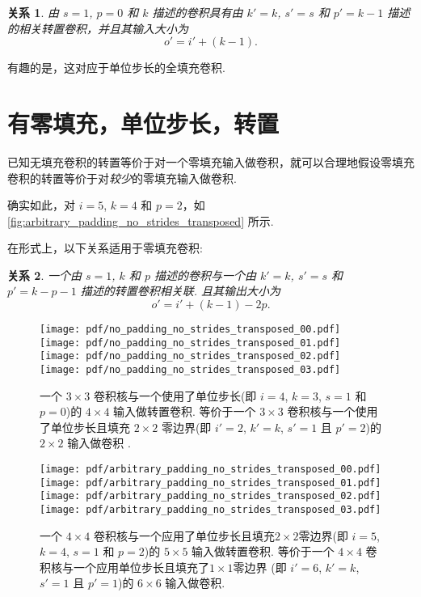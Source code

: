 \documentclass[notitlepage]{ctexrep}
\newtheorem{relationship}{关系}
\begin{document}
\begin{relationship}\label{rel:no_padding_no_strides_transposed}
由 $s = 1$, $p = 0$ 和 $k$ 描述的卷积具有由 $k' = k$, $s' = s$ 和 $p' = k - 1$ 描述的相关转置卷积，并且其输入大小为 
\begin{equation*}
    o' = i' + (k - 1).
\end{equation*}
\end{relationship}

有趣的是，这对应于单位步长的全填充卷积.

\section{有零填充，单位步长，转置}

已知无填充卷积的转置等价于对一个零填充输入做卷积，就可以合理地假设零填充卷积的转置等价于对{\em 较少}的零填充输入做卷积.

确实如此，对 $i = 5$, $k = 4$ 和 $p = 2$，如 \autoref{fig:arbitrary_padding_no_strides_transposed} 所示.

在形式上，以下关系适用于零填充卷积:

\begin{relationship}\label{rel:arbitrary_padding_no_strides_transposed}
一个由 $s = 1$, $k$ 和 $p$ 描述的卷积与一个由 $k' = k$, $s' = s$ 和 $p' = k -
p - 1$ 描述的转置卷积相关联. 且其输出大小为
\begin{equation*}
    o' = i' + (k - 1) - 2p.
\end{equation*}
\end{relationship}

\begin{figure}[p]
    \centering
    \texttt{[image: pdf/no\_padding\_no\_strides\_transposed\_00.pdf]}
    \texttt{[image: pdf/no\_padding\_no\_strides\_transposed\_01.pdf]}
    \texttt{[image: pdf/no\_padding\_no\_strides\_transposed\_02.pdf]}
    \texttt{[image: pdf/no\_padding\_no\_strides\_transposed\_03.pdf]}
    \caption{\label{fig:no_padding_no_strides_transposed} 
    一个 $3 \times 3$ 卷积核与一个使用了单位步长(即 $i = 4$, $k = 3$, $s = 1$ 和 $p = 0$)的 $4 \times 4$ 输入做转置卷积. 等价于一个 $3 \times 3$ 卷积核与一个使用了单位步长且填充 $2 \times 2$ 零边界(即 $i' = 2$, $k' = k$, $s' = 1$ 且 $p' = 2$)的 $2 \times 2$ 输入做卷积 .}
\end{figure}

\begin{figure}[p]
    \centering
    \texttt{[image: pdf/arbitrary\_padding\_no\_strides\_transposed\_00.pdf]}
    \texttt{[image: pdf/arbitrary\_padding\_no\_strides\_transposed\_01.pdf]}
    \texttt{[image: pdf/arbitrary\_padding\_no\_strides\_transposed\_02.pdf]}
    \texttt{[image: pdf/arbitrary\_padding\_no\_strides\_transposed\_03.pdf]}
    \caption{\label{fig:arbitrary_padding_no_strides_transposed} 
    一个 $4 \times 4$ 卷积核与一个应用了单位步长且填充$2 \times 2$零边界(即 $i = 5$, $k = 4$, $s = 1$ 和 $p = 2$)的 $5 \times 5$ 输入做转置卷积. 等价于一个 $4 \times 4$ 卷积核与一个应用单位步长且填充了$1 \times 1$零边界 (即 $i' = 6$, $k' = k$, $s' = 1$ 且 $p' = 1$)的 $6 \times 6$ 输入做卷积.}
\end{figure}
\end{document}
